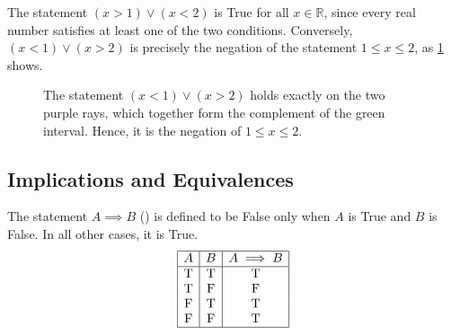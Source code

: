 \begin{example}
\label{ex:disjunction_interval}
The statement $(x > 1) \vee (x < 2)$ is True for all $x \in \mathbb{R}$, since every real number satisfies at least one of the two conditions. Conversely, $(x < 1) \vee (x > 2)$ is precisely the negation of the statement $1 \le x \le 2$, as \cref{fig:or_number_line} shows.
\end{example}

\begin{figure}[ht!]
  \centering
  \caption{The statement $(x < 1) \vee (x > 2)$ holds exactly on the two purple rays, which together form the complement of the green interval. Hence, it is the negation of $1 \le x \le 2$.}
  \label{fig:or_number_line}
\end{figure}

\subsection{Implications and Equivalences}

\begin{definition}[Implication]
\label{def:implication}
The statement $A \implies B$ () is defined to be False only when $A$ is True and $B$ is False. In all other cases, it is True.
\[
\begin{array}{|c|c|c|}
\hline
A & B & A \implies B \\
\hline
\text{T} & \text{T} & \text{T} \\
\text{T} & \text{F} & \text{F} \\
\text{F} & \text{T} & \text{T} \\
\text{F} & \text{F} & \text{T} \\
\hline
\end{array}
\]
\end{definition}

